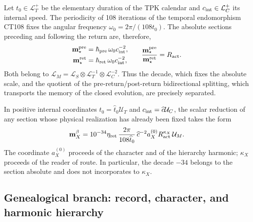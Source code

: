 Let \(t_0\in\mathcal L_T^+\) be the elementary duration of the TPK calendar and
\(c_{\rm int}\in\mathcal L_C^+\) its internal speed. The periodicity of
108 iterations of the temporal endomorphism CT108 fixes the angular frequency
\(\omega_0=2\pi/(108t_0)\). The absolute sections preceding and following the
return are, therefore,
\begin{equation}
 \begin{aligned}
 \mathbf m_\star^{\rm pre}
 &=\boldsymbol\hbar_{\rm pre}\,\omega_0c_{\rm int}^{-2},\\
 \mathbf m_\star^{\rm ret}
 &=\boldsymbol\hbar_{\rm ret}\,\omega_0c_{\rm int}^{-2},
 \end{aligned}
 \qquad
 \frac{\mathbf m_\star^{\rm pre}}
      {\mathbf m_\star^{\rm ret}}=R_{\rm act}.
 \label{eq:secciones-absolutas-masa-autonoma}
\end{equation}
Both belong to
\(
 \mathcal L_M=\mathcal L_S\otimes\mathcal L_T^{-1}
 \otimes\mathcal L_C^{-2}
\).
Thus the decade, which fixes the absolute scale, and the
quotient of the pre-return/post-return bidirectional splitting, which
transports the memory of the closed evolution, are precisely separated.

In positive internal coordinates
\(t_0=\widehat t_0\mathcal U_T\) and
\(c_{\rm int}=\widehat c\mathcal U_C\), the scalar reduction of any
section whose physical realization has already been fixed takes the form
\begin{equation}
 \mathbf m_X^\beta
 =10^{-34}\eta_{\rm ret}\,
  \frac{2\pi}{108\widehat t_0}\,\widehat c^{-2}
  a_X^{(0)}R_{\rm act}^{\kappa_X}\,\mathcal U_M .
 \label{eq:ley-escalar-general-masas-autonoma}
\end{equation}
The coordinate \(a_X^{(0)}\) proceeds of the character and of the hierarchy harmonic;
\(\kappa_X\) proceeds of the reader of route. In particular, the decade
\(-34\) belongs to the section absolute and does not  incorporates to
\(\kappa_X\).

\subsection{Genealogical branch: record, character, and harmonic hierarchy}

